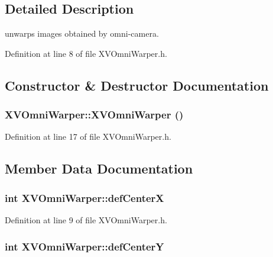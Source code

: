 \subsection{Detailed Description}
unwarps images obtained by omni-camera.





Definition at line 8 of file XVOmni\-Warper.h.

\subsection{Constructor \& Destructor Documentation}
\label{XVOmniWarper_a0}
\hypertarget{class_XVOmniWarper_a0}{
\subsubsection[XVOmniWarper]{\setlength{\rightskip}{0pt plus 5cm}XVOmni\-Warper::XVOmni\-Warper ()}}




Definition at line 17 of file XVOmni\-Warper.h.

\subsection{Member Data Documentation}
\label{XVOmniWarper_p0}
\hypertarget{class_XVOmniWarper_p0}{
\subsubsection[defCenterX]{\setlength{\rightskip}{0pt plus 5cm}int XVOmni\-Warper::def\-Center\-X}}




Definition at line 9 of file XVOmni\-Warper.h.\label{XVOmniWarper_p1}
\hypertarget{class_XVOmniWarper_p1}{
\subsubsection[defCenterY]{\setlength{\rightskip}{0pt plus 5cm}int XVOmni\-Warper::def\-Center\-Y}}




